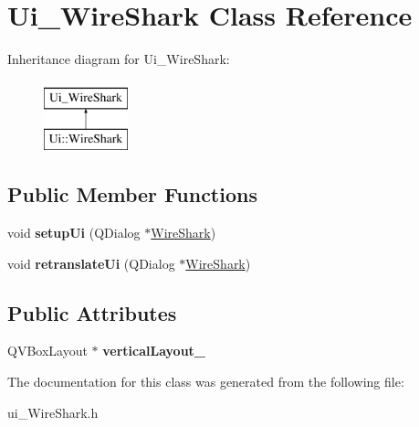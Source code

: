 \hypertarget{class_ui___wire_shark}{\section{Ui\-\_\-\-Wire\-Shark Class Reference}
\label{class_ui___wire_shark}
}
Inheritance diagram for Ui\-\_\-\-Wire\-Shark\-:\begin{figure}[H]
\begin{center}
\leavevmode
\includegraphics[height=2.000000cm]{class_ui___wire_shark}
\end{center}
\end{figure}
\subsection*{Public Member Functions}
\begin{DoxyCompactItemize}
\item 
\hypertarget{class_ui___wire_shark_a9984f0a9a2ec48156e276b021e8b7ee0}{void {\bfseries setup\-Ui} (Q\-Dialog $\ast$\hyperlink{class_wire_shark}{Wire\-Shark})}\label{class_ui___wire_shark_a9984f0a9a2ec48156e276b021e8b7ee0}

\item 
\hypertarget{class_ui___wire_shark_a303291ed614820e4452bf6252b03e595}{void {\bfseries retranslate\-Ui} (Q\-Dialog $\ast$\hyperlink{class_wire_shark}{Wire\-Shark})}\label{class_ui___wire_shark_a303291ed614820e4452bf6252b03e595}

\end{DoxyCompactItemize}
\subsection*{Public Attributes}
\begin{DoxyCompactItemize}
\item 
\hypertarget{class_ui___wire_shark_a1a9a519eee63c5e916cb3d45120ef1a9}{Q\-V\-Box\-Layout $\ast$ {\bfseries vertical\-Layout\-\_}}\label{class_ui___wire_shark_a1a9a519eee63c5e916cb3d45120ef1a9}

\end{DoxyCompactItemize}


The documentation for this class was generated from the following file\-:\begin{DoxyCompactItemize}
\item 
ui\-\_\-\-Wire\-Shark.\-h\end{DoxyCompactItemize}
